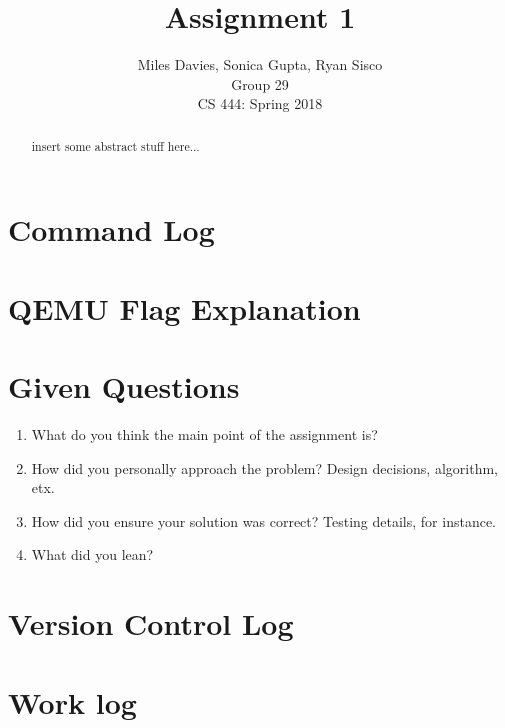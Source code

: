 \documentclass[10pt,draftclsnofoot]{article}
\title{Assignment 1}
\author{Miles Davies, Sonica Gupta, Ryan Sisco \\ Group 29 \\ CS 444: Spring 2018}
\begin{document}
\maketitle
\begin{abstract}
insert some abstract stuff here...
\end{abstract}

\newpage

\tableofcontents
\newpage 

\section{Command Log}



\section{QEMU Flag Explanation}

\section{Given Questions}
\begin{enumerate}
\item{What do you think the main point of the assignment is?}

\item{How did you personally approach the problem? Design decisions, algorithm, etx.}

\item{How did you ensure your solution was correct? Testing details, for instance.}

\item{What did you lean?} 

\end{enumerate}
\section{Version Control Log}

\section{Work log}
\end{document}
